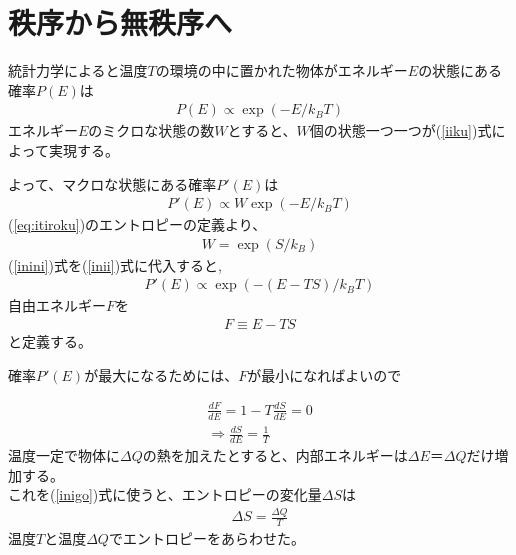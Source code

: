 \section{秩序から無秩序へ}
統計力学によると温度$T$の環境の中に置かれた物体がエネルギー$E$の状態にある確率$P(E)$は
\begin{align}
  P(E)\propto\exp{(-E/{k_BT})}    \label{inio}
\end{align}
エネルギー$E$のミクロな状態の数$W$とすると、$W$個の状態一つ一つが(\ref{iiku})式によって実現する。\par
よって、マクロな状態にある確率$P'(E)$は
\begin{align}
   P'(E)\propto W\exp{(-E/{k_BT}) }   \label{inii}
\end{align}
(\ref{eq:itiroku})のエントロピーの定義より、
\begin{align}
   W=\exp{(S/k_B)}   \label{inini}
\end{align}
(\ref{inini})式を(\ref{inii})式に代入すると,
\begin{align}
   P'(E)\propto \exp{(-(E-TS)/{k_BT})}   \label{ijisa}
\end{align}
自由エネルギー$F$を
\begin{align}
   F\equiv E-TS    \label{Fteigi}
\end{align}
と定義する。\par
確率$P'(E)$が最大になるためには、$F$が最小になればよいので

\begin{align}
  \frac{dF}{dE}=1-T\frac{dS}{dE}=0\\
	\Rightarrow \frac{dS}{dE}=\frac{1}{T} \label{inigo}
\end{align}
温度一定で物体に$\Delta Q$の熱を加えたとすると、内部エネルギーは$\Delta E＝\Delta Q$だけ増加する。\\
これを(\ref{inigo})式に使うと、エントロピーの変化量$\Delta S$は
\begin{align*}
  \Delta S=\frac{\Delta Q}{T}
\end{align*}
温度$T$と温度$\Delta Q$でエントロピーをあらわせた。
